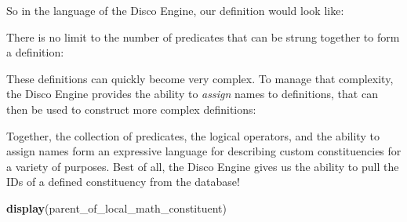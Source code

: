 \documentclass[]{book}
\newenvironment{Shaded}{\begin{snugshade}}{\end{snugshade}}
\newcommand{\KeywordTok}[1]{\textcolor[rgb]{0.13,0.29,0.53}{\textbf{#1}}}
\newcommand{\NormalTok}[1]{#1}
\newcommand{\OperatorTok}[1]{\textcolor[rgb]{0.81,0.36,0.00}{\textbf{#1}}}
\newcommand{\StringTok}[1]{\textcolor[rgb]{0.31,0.60,0.02}{#1}}
\begin{document}
So in the language of the Disco Engine, our definition would look like:

\begin{Shaded}
\end{Shaded}

There is no limit to the number of predicates that can be strung together to form a definition:

\begin{Shaded}
\end{Shaded}

These definitions can quickly become very complex. To manage that complexity, the Disco Engine provides the ability to \emph{assign} names to definitions, that can then be used to construct more complex definitions:

\begin{Shaded}
\end{Shaded}

Together, the collection of predicates, the logical operators, and the ability to assign names form an expressive language for describing custom constituencies for a variety of purposes. Best of all, the Disco Engine gives us the ability to pull the IDs of a defined constituency from the database!

\begin{Shaded}
\begin{Highlighting}[]
\KeywordTok{display}\NormalTok{(parent_of_local_math_constituent)}
\end{Highlighting}
\end{Shaded}
\end{document}
